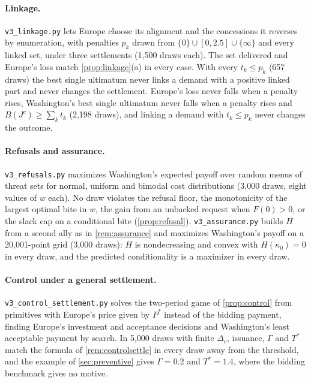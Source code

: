 \paragraph{Linkage.} \texttt{v3\_linkage.py} lets Europe choose its alignment and the concessions it reverses by enumeration, with penalties $p_k$ drawn from $\{0\}\cup[0,2.5]\cup\{\infty\}$ and every linked set, under three settlements (1,500 draws each). The set delivered and Europe's loss match \cref{prop:linkage}(a) in every case. With every $t_k\le p_k$ (657 draws) the best single ultimatum never links a demand with a positive linked part and never changes the settlement. Europe's loss never falls when a penalty rises, Washington's best single ultimatum never falls when a penalty rises and $B(J^c)\ge\sum_kt_k$ (2,198 draws), and linking a demand with $t_k\le p_k$ never changes the outcome.

\paragraph{Refusals and assurance.} \texttt{v3\_refusals.py} maximizes Washington's expected payoff over random menus of threat sets for normal, uniform and bimodal cost distributions (3,000 draws, eight values of $w$ each). No draw violates the refusal floor, the monotonicity of the largest optimal bite in $w$, the gain from an unbacked request when $F(0)>0$, or the slack cap on a conditional bite (\cref{prop:refusal}). \texttt{v3\_assurance.py} builds $H$ from a second ally as in \cref{rem:assurance} and maximizes Washington's payoff on a 20,001-point grid (3,000 draws): $H$ is nondecreasing and convex with $H(\kappa_0)=0$ in every draw, and the predicted conditionality is a maximizer in every draw.

\paragraph{Control under a general settlement.} \texttt{v3\_control\_settlement.py} solves the two-period game of \cref{prop:control} from primitives with Europe's price given by $P^*$ instead of the bidding payment, finding Europe's investment and acceptance decisions and Washington's least acceptable payment by search. In 5,000 draws with finite $\Delta_c$, issuance, $\Gamma$ and $T^*$ match the formula of \cref{rem:controlsettle} in every draw away from the threshold, and the example of \cref{sec:preventive} gives $\Gamma=0.2$ and $T^*=1.4$, where the bidding benchmark gives no motive.

